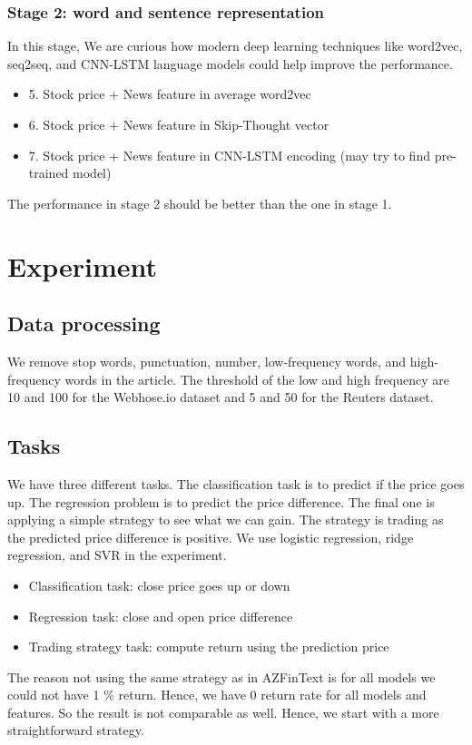 \documentclass[sigconf]{acmart}
\begin{document}
\subsubsection{Stage 2: word and sentence representation}
	In this stage, We are curious how modern deep learning techniques like word2vec, seq2seq, and CNN-LSTM language models could help improve the performance.  
	\begin{itemize}
		\item 5. Stock price + News feature in average word2vec \cite{word2vec1, word2vec2}
		\item 6. Stock price + News feature in Skip-Thought vector\cite{skip}
		\item 7. Stock price + News feature in CNN-LSTM encoding \cite{CNN2RNN} (may try to find pre-trained model)
	\end{itemize}
	The performance in stage 2 should be better than the one in stage 1.

\section{Experiment}
\subsection{Data processing}
We remove stop words, punctuation, number, low-frequency words, and high-frequency words in the article. The threshold of the low and high frequency are 10 and 100
for the Webhose.io dataset and 5 and 50 for the Reuters dataset.

\subsection{Tasks}
We have three different tasks. The classification task is to predict if the price goes up. The regression problem is to predict the price difference. The final one is applying a simple strategy to see what we can
gain. The strategy is trading as the predicted price difference is positive. We use logistic regression, ridge regression, and SVR in the experiment.
\begin{itemize}
	\item Classification task: close price goes up or down
	\item Regression task: close and open price difference
	\item Trading strategy task: compute return using the prediction price
\end{itemize} 
The reason not using the same strategy as in AZFinText is for all models we could not have 1 \% return. Hence, we have 0 return rate for all models and features.
So the result is not comparable as well. Hence, we start with a more straightforward strategy.
\end{document}

